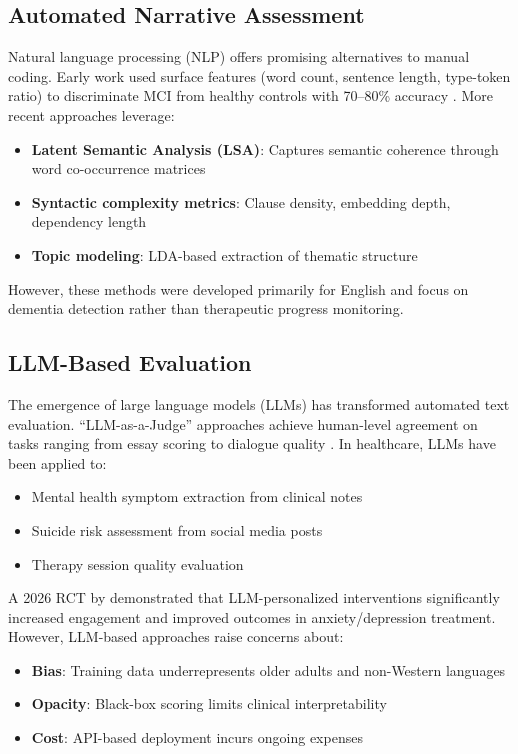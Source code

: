 \documentclass[11pt]{article}
\begin{document}
\subsection{Automated Narrative Assessment}

Natural language processing (NLP) offers promising alternatives to manual coding. Early work used surface features (word count, sentence length, type-token ratio) to discriminate MCI from healthy controls with 70--80\% accuracy \citep{fraser2024}. More recent approaches leverage:

\begin{itemize}
    \item \textbf{Latent Semantic Analysis (LSA)}: Captures semantic coherence through word co-occurrence matrices \citep{thomas2025}
    \item \textbf{Syntactic complexity metrics}: Clause density, embedding depth, dependency length \citep{lu2025}
    \item \textbf{Topic modeling}: LDA-based extraction of thematic structure \citep{zhang2025}
\end{itemize}

However, these methods were developed primarily for English and focus on dementia detection rather than therapeutic progress monitoring.

\subsection{LLM-Based Evaluation}

The emergence of large language models (LLMs) has transformed automated text evaluation. ``LLM-as-a-Judge'' approaches achieve human-level agreement on tasks ranging from essay scoring \citep{zheng2025} to dialogue quality \citep{liu2025}. In healthcare, LLMs have been applied to:
\begin{itemize}
    \item Mental health symptom extraction from clinical notes \citep{chen2025}
    \item Suicide risk assessment from social media posts \citep{wang2025}
    \item Therapy session quality evaluation \citep{goldberg2025}
\end{itemize}

A 2026 RCT by \citet{limbic2026} demonstrated that LLM-personalized interventions significantly increased engagement and improved outcomes in anxiety/depression treatment. However, LLM-based approaches raise concerns about:
\begin{itemize}
    \item \textbf{Bias}: Training data underrepresents older adults and non-Western languages \citep{bender2021}
    \item \textbf{Opacity}: Black-box scoring limits clinical interpretability
    \item \textbf{Cost}: API-based deployment incurs ongoing expenses
\end{itemize}
\end{document}

